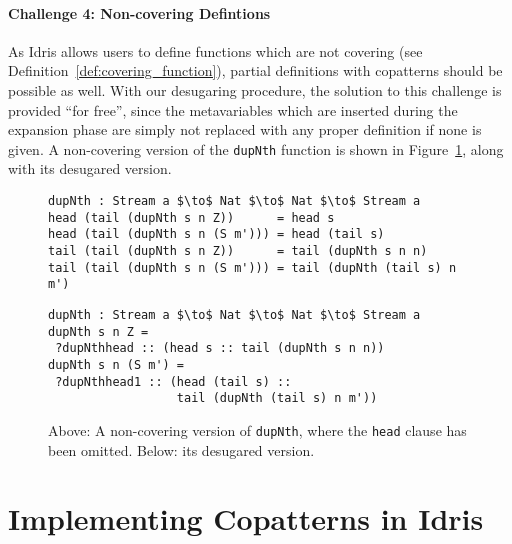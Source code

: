 \paragraph{Challenge 4: Non-covering Defintions} As Idris allows users to
define functions which are not covering (see
Definition~\ref{def:covering_function}), partial definitions with copatterns
should be possible as well. With our desugaring procedure, the solution to this
challenge is provided ``for free'', since the metavariables which are inserted
during the expansion phase are simply not replaced with any proper definition if
none is given. A non-covering version of the \texttt{dupNth} function is shown
in Figure~\ref{fig:dupNth_partial}, along with its desugared version.

\begin{figure}
\begin{lstlisting}[mathescape]
dupNth : Stream a $\to$ Nat $\to$ Nat $\to$ Stream a
head (tail (dupNth s n Z))      = head s
head (tail (dupNth s n (S m'))) = head (tail s)
tail (tail (dupNth s n Z))      = tail (dupNth s n n)
tail (tail (dupNth s n (S m'))) = tail (dupNth (tail s) n m')
\end{lstlisting}
\begin{lstlisting}[mathescape]
dupNth : Stream a $\to$ Nat $\to$ Nat $\to$ Stream a
dupNth s n Z = 
 ?dupNthhead :: (head s :: tail (dupNth s n n))
dupNth s n (S m') = 
 ?dupNthhead1 :: (head (tail s) :: 
                  tail (dupNth (tail s) n m'))
\end{lstlisting}

  \caption{Above: A non-covering version of \texttt{dupNth}, where the \texttt{head}
    clause has been omitted. Below: its desugared version.}
  \label{fig:dupNth_partial}
\end{figure}


\section{Implementing Copatterns in Idris}


